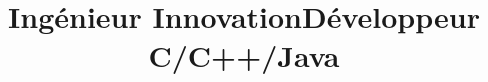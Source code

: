 \documentclass[10pt, a4paper]{moderncv}
\title{Ingénieur Innovation\newline{}Développeur C/C++/Java}
\begin{document}
\makecvtitle
\end{document}
